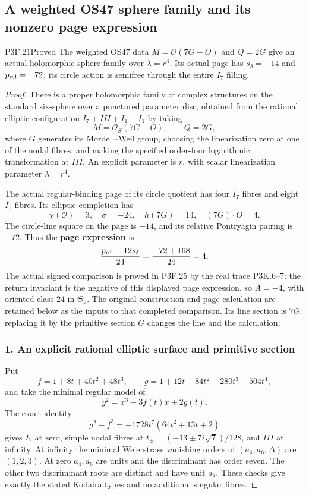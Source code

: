 \subsection{A weighted OS47 sphere family and its nonzero page expression}
\begin{statement}{P3F.21}{Proved}
The weighted OS47 data $M=\mathcal O(7G-O)$ and $Q=2G$ give an actual holomorphic sphere family over $\lambda=r^4$. Its actual page has $s_\delta=-14$ and $p_{\rm rel}=-72$; its circle action is semifree through the entire $I_7$ filling.
\end{statement}
\begin{proof}
There is a proper holomorphic family of complex structures on the standard six-sphere over a punctured parameter disc, obtained from the rational elliptic configuration \(I_7+III+I_1+I_1\) by taking \[
 M=\mathcal O_S(7G-O),\qquad Q=2G,
\] where \(G\) generates its Mordell--Weil group, choosing the linearization zero at one of the nodal fibres, and making the specified order-four logarithmic transformation at \(III\). An explicit parameter is \(r\), with scalar linearization parameter \(\lambda=r^4\).

The actual regular-binding page of its circle quotient has four \(I_7\) fibres and eight \(I_1\) fibres. Its elliptic completion has \[
 \chi(\mathcal O)=3,\quad \sigma=-24,\quad
 h(7G)=14,\quad (7G)\cdot O=4.
\] The circle-line square on the page is \(-14\), and its relative Pontryagin pairing is \(-72\). Thus the \textbf{page expression} is \[
 \frac{p_{\rm rel}-12s_\delta}{24}
   =\frac{-72+168}{24}=4.
\] The actual signed comparison is proved in P3F.25 by the real trace P3K.6--7: the return invariant is the negative of this displayed page expression, so \(A=-4\), with oriented class \(24\) in \(\Theta_7\). The original construction and page calculation are retained below as the inputs to that completed comparison. Its line section is \(7G\); replacing it by the primitive section \(G\) changes the line and the calculation.

\subsubsection{1. An explicit rational elliptic surface and primitive section}\label{an-explicit-rational-elliptic-surface-and-primitive-section}

Put \[
 f=1+8t+40t^2+48t^3,\qquad
 g=1+12t+84t^2+280t^3+504t^4,
\] and take the minimal regular model of \[
 y^2=x^3-3f(t)x+2g(t).
\] The exact identity \[
 g^2-f^3=-1728t^7(64t^2+13t+2)
\] gives \(I_7\) at zero, simple nodal fibres at \(t_\pm=(-13\pm7i\sqrt7)/128\), and \(III\) at infinity. At infinity the minimal Weierstrass vanishing orders of \((a_4,a_6,\Delta)\) are \((1,2,3)\). At zero \(a_4,a_6\) are units and the discriminant has order seven. The other two discriminant roots are distinct and have unit \(a_4\). These checks give exactly the stated Kodaira types and no additional singular fibres.


\end{proof}
